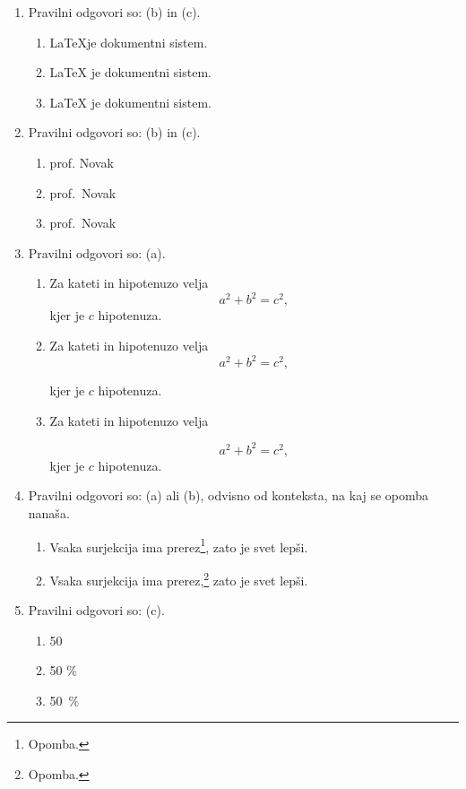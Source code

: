 \documentclass[11pt]{article}
\begin{document}
\begin{enumerate}
    \item Pravilni odgovori so: (b) in (c).%
    \begin{enumerate}
        \item \LaTeX je dokumentni sistem.
        \item {\LaTeX} je dokumentni sistem.
        \item \LaTeX{} je dokumentni sistem.
    \end{enumerate}

    \item Pravilni odgovori so: (b) in (c).%
    \begin{enumerate}
        \item prof. Novak
        \item prof.~Novak
        \item prof.\ Novak
    \end{enumerate}

    \item Pravilni odgovori so: (a).%
    \begin{enumerate}
        \item
Za kateti in hipotenuzo velja
\[
  a^2 + b^2 = c^2,
\]
kjer je \(c\) hipotenuza.
        \item
Za kateti in hipotenuzo velja
\[
  a^2 + b^2 = c^2,
\]

kjer je \(c\) hipotenuza.
        \item
Za kateti in hipotenuzo velja

\[
  a^2 + b^2 = c^2,
\]
kjer je \(c\) hipotenuza.
    \end{enumerate}

    \item Pravilni odgovori so: (a) ali (b), odvisno od konteksta, na kaj se opomba nanaša.%
    \begin{enumerate}
        \item Vsaka surjekcija ima prerez\footnote{Opomba.}, zato je svet lepši.
        \item Vsaka surjekcija ima prerez,\footnote{Opomba.} zato je svet lepši.
    \end{enumerate}

    \item Pravilni odgovori so: (c).%
    \begin{enumerate}
        \item 50 %
        \item 50 \%
        \item 50~\%
    \end{enumerate}


\end{enumerate}
\end{document}
